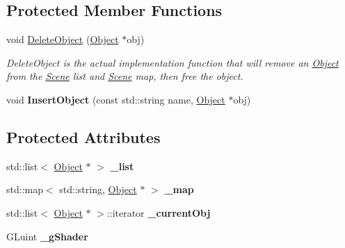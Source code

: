 \subsection*{Protected Member Functions}
\begin{DoxyCompactItemize}
\item 
void \hyperlink{class_scene_a8bbe0e5b1bfc71034b18e240e86aa285}{Delete\-Object} (\hyperlink{class_object}{Object} $\ast$obj)
\begin{DoxyCompactList}\small\item\em Delete\-Object is the actual implementation function that will remove an \hyperlink{class_object}{Object} from the \hyperlink{class_scene}{Scene} list and \hyperlink{class_scene}{Scene} map, then free the object. \end{DoxyCompactList}\item 
\hypertarget{class_scene_ae8d51ddc196248a7cbd1f3640851dbd4}{void {\bfseries Insert\-Object} (const std\-::string name, \hyperlink{class_object}{Object} $\ast$obj)}\label{class_scene_ae8d51ddc196248a7cbd1f3640851dbd4}

\end{DoxyCompactItemize}
\subsection*{Protected Attributes}
\begin{DoxyCompactItemize}
\item 
\hypertarget{class_scene_acdd0123ca6b2d64d8d447bb485b235fc}{std\-::list$<$ \hyperlink{class_object}{Object} $\ast$ $>$ {\bfseries \-\_\-list}}\label{class_scene_acdd0123ca6b2d64d8d447bb485b235fc}

\item 
\hypertarget{class_scene_a8bd5d86484a12255b26b92b6cbf8d29a}{std\-::map$<$ std\-::string, \hyperlink{class_object}{Object} $\ast$ $>$ {\bfseries \-\_\-map}}\label{class_scene_a8bd5d86484a12255b26b92b6cbf8d29a}

\item 
\hypertarget{class_scene_ae87ca5350fcc595f3f15a4fd3c39f3d9}{std\-::list$<$ \hyperlink{class_object}{Object} $\ast$ $>$\-::iterator {\bfseries \-\_\-current\-Obj}}\label{class_scene_ae87ca5350fcc595f3f15a4fd3c39f3d9}

\item 
\hypertarget{class_scene_a8f9bdd8ec5edb1f414fbd314a36e2724}{G\-Luint {\bfseries \-\_\-g\-Shader}}\label{class_scene_a8f9bdd8ec5edb1f414fbd314a36e2724}

\end{DoxyCompactItemize}
